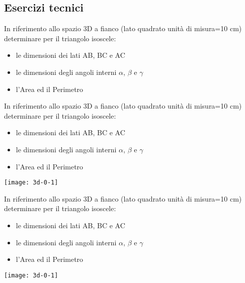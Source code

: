 \subsection{Esercizi tecnici}
\begin{questions}
	\question
	\begin{minipage}[b]{0.6\textwidth}
		In riferimento allo spazio 3D a fianco (lato 
quadrato unità di misura=10 cm) determinare per il 
triangolo isoscele:
\begin{itemize}
	\item  le dimensioni dei lati AB, BC e AC
	\item le dimensioni degli angoli interni $\alpha$, $\beta$ e $\gamma$
	\item l'Area ed il Perimetro
\end{itemize}
	\end{minipage}
	\hfill
\raisebox{-1\baselineskip}{
		\texttt{[image: 3d-0-1]}}

 
		\question
		\begin{minipage}[b]{0.6\textwidth}
			In riferimento allo spazio 3D a fianco (lato 
	quadrato unità di misura=10 cm) determinare per il 
	triangolo isoscele:
	\begin{itemize}
		\item  le dimensioni dei lati AB, BC e AC
		\item le dimensioni degli angoli interni $\alpha$, $\beta$ e $\gamma$
		\item l'Area ed il Perimetro
	\end{itemize}
		\end{minipage}
		\begin{minipage}{0.3\textwidth}
			\texttt{[image: 3d-0-1]}
		\end{minipage}

		\question
		\begin{minipage}[b]{0.6\textwidth}
			In riferimento allo spazio 3D a fianco (lato 
	quadrato unità di misura=10 cm) determinare per il 
	triangolo isoscele:
	\begin{itemize}
		\item  le dimensioni dei lati AB, BC e AC
		\item le dimensioni degli angoli interni $\alpha$, $\beta$ e $\gamma$
		\item l'Area ed il Perimetro
	\end{itemize}
		\end{minipage}
		\begin{minipage}{0.3\textwidth}
			\texttt{[image: 3d-0-1]}
		\end{minipage}
\end{questions}